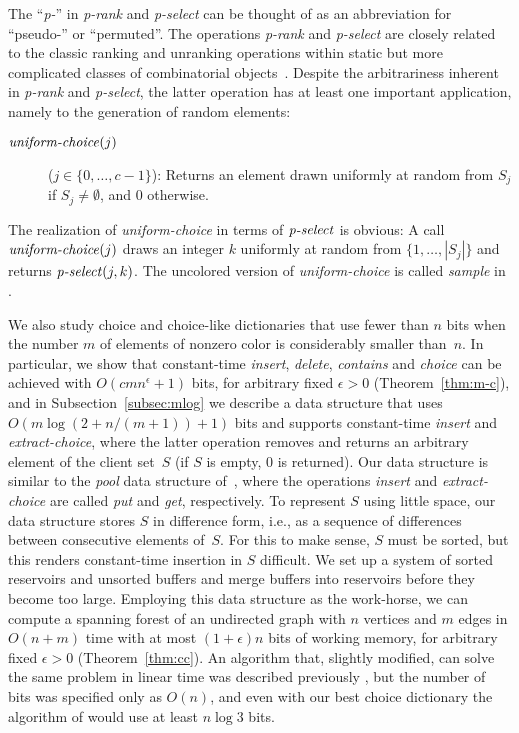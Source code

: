 \documentclass[envcountsame,envcountsect,undated,nolinenumbers]{lnthi}
\def\Tvn#1{\hbox{\textit{#1\/}}}
\begin{document}
The ``\Tvn{p-}'' in \Tvn{p-rank} and \Tvn{p-select} can be thought
of as an abbreviation for ``pseudo-'' or ``permuted''.
The operations \Tvn{p-rank} and \Tvn{p-select}
are closely related to
the classic ranking and
unranking operations within static but more complicated
classes of combinatorial objects~\cite{KreS99}.
Despite the arbitrariness inherent in
\Tvn{p-rank} and \Tvn{p-select}, the latter operation
has at least one important application, namely
to the generation of random elements:

\begin{description}
\item[\normalfont$\Tvn{uniform-choice}(j)$]
($j\in\{0,\ldots,c-1\}$):
Returns an element drawn uniformly at random
from $S_j$ if $S_j\not=\emptyset$, and 0 otherwise.
\end{description}

The realization of \Tvn{uniform-choice} in
terms of $\Tvn{p-select}$ is obvious:
A call $\Tvn{uniform-choice}(j)$
draws an integer $k$ uniformly at random
from $\{1,\ldots,|S_j|\}$ and returns
$\Tvn{p-select}(j,k)$.
The uncolored version of
\Tvn{uniform-choice} is called \Tvn{sample}
in \cite[Problem 1.3.35]{SedW11}.

We also study choice and choice-like dictionaries
that use fewer than $n$ bits when the number
$m$ of elements of nonzero color is considerably
smaller than~$n$.
In particular, we
show that constant-time
\Tvn{insert}, \Tvn{delete}, \Tvn{contains} and \Tvn{choice}
can be achieved with
$O(c m n^\epsilon+1)$ bits, for arbitrary
fixed $\epsilon>0$ (Theorem~\ref{thm:m-c}),
and in Subsection~\ref{subsec:mlog}
we describe
a data structure that uses
$O(m\log(2+{n/{(m+1)}})+1)$ bits
and supports
constant-time \Tvn{insert} and \Tvn{extract-choice},
where the latter operation
removes and returns an arbitrary element
of the client set~$S$
(if $S$ is empty, 0 is returned).
Our data structure is similar to the \emph{pool}
data structure of~\cite{HerS08}, where the operations
\Tvn{insert} and \Tvn{extract-choice} are called
\Tvn{put} and \Tvn{get}, respectively.
To represent $S$
using little space, our data structure stores $S$
in difference form, i.e., as a sequence of differences
between consecutive elements of~$S$.
For this to make sense, $S$ must be sorted, but this
renders constant-time insertion in $S$ difficult.
We set up a system of sorted reservoirs and
unsorted buffers and merge buffers into reservoirs
before they become too large.
Employing this data structure as the work-horse,
we can compute a spanning forest of an undirected
graph
with $n$ vertices and $m$ edges
in $O(n+m)$
time with at most $(1+\epsilon)n$ bits of
working memory, for arbitrary
fixed $\epsilon>0$ (Theorem~\ref{thm:cc}).
An algorithm that, slightly modified, can solve
the same problem in linear time was described previously
\cite[Theorem~5.1]{ElmHK15}, but the number of bits was
specified only as $O(n)$, and even with our best
choice dictionary the algorithm of
\cite{ElmHK15} would use at least
$n\log 3$ bits.
\end{document}
